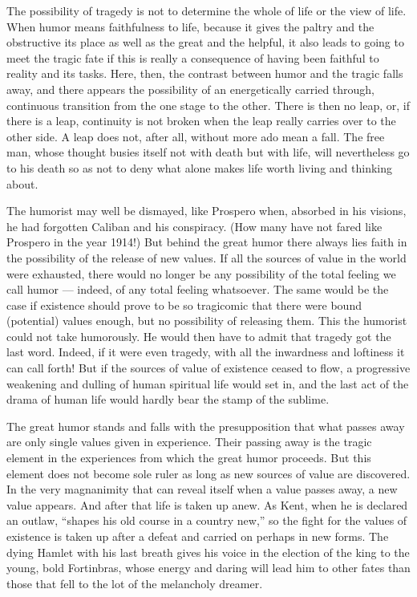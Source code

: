 \documentclass[12pt]{book}
\newcommand{\opage}[1]{\marginnote{\footnotesize\textit{[#1]}}}
\begin{document}
The possibility of tragedy is not to determine the whole of life or the view of life. When
humor means faithfulness to life, because it gives the paltry and the obstructive its place
as well as the great and the helpful, it also leads to going to meet the tragic fate if
this is really a consequence of having been faithful to reality and its tasks. Here, then,
the contrast between humor and the tragic falls away, and there appears the possibility of
an energetically carried through, continuous transition from the one stage to the other.
There is then no leap, or, if there is a leap, continuity is not broken when the leap
really carries over to the other side. A leap does not, after all, without more ado mean a
fall. The free man, whose thought busies itself not with death but with life, will
nevertheless go to his death so as not to deny what alone makes life worth living and
thinking about.

The humorist may well be dismayed, like Prospero when, absorbed in his visions, he had
forgotten Caliban and his conspiracy. (How many have not fared like Prospero in the year
1914!) But behind the great humor there always lies faith in the possibility of the
release of new values. If all the sources of value in the world were exhausted, there would
no longer be any possibility of the total feeling we call humor --- indeed, of any total
feeling whatsoever. The same would be the case if existence should prove to be so
tragicomic that there were bound (potential) values enough, but no possibility of releasing
them. This the humorist could not take humorously. He would then have to admit that tragedy
got the last word. Indeed, if it were even tragedy, with all the inwardness and loftiness it
can call forth! But if the sources of value of existence ceased to flow, a progressive
weakening and dulling of human spiritual life would set in, and the last act of the drama
of human life would hardly bear the stamp of the sublime.

\opage{108}The great humor stands and falls with the presupposition that what passes away
are only single values given in experience. Their passing away is the tragic element in the
experiences from which the great humor proceeds. But this element does not become sole ruler
as long as new sources of value are discovered. In the very magnanimity that can reveal
itself when a value passes away, a new value appears. And after that life is taken up anew.
As Kent, when he is declared an outlaw, ``shapes his old course in a country new,'' so the
fight for the values of existence is taken up after a defeat and carried on perhaps in new
forms. The dying Hamlet with his last breath gives his voice in the election of the king to
the young, bold Fortinbras, whose energy and daring will lead him to other fates than those
that fell to the lot of the melancholy dreamer.
\end{document}
